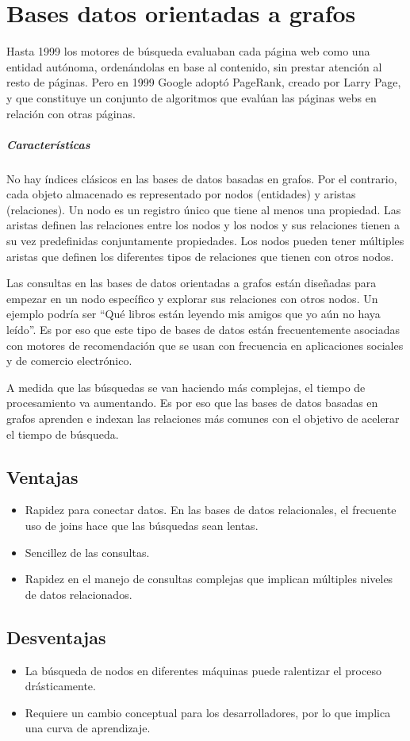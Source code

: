 \section{Bases datos orientadas a grafos}
 Hasta 1999 los motores de búsqueda evaluaban cada página web como una entidad autónoma, ordenándolas en base al contenido, sin prestar atención al resto de páginas. Pero en 1999 Google adoptó PageRank, creado por Larry Page, y que constituye un conjunto de algoritmos que evalúan las páginas webs en relación con otras páginas. \cite{12}

\subparagraph{Características}
No hay índices clásicos en las bases de datos basadas en grafos. Por el contrario, cada objeto almacenado es representado por nodos (entidades) y aristas (relaciones). Un nodo es un registro único que tiene al menos una propiedad. Las aristas definen las relaciones entre los nodos y los nodos y sus relaciones tienen a su vez predefinidas conjuntamente propiedades. Los nodos pueden tener múltiples aristas que definen los diferentes tipos de relaciones que tienen con otros nodos.

Las consultas en las bases de datos orientadas a grafos están diseñadas para empezar en un nodo específico y explorar sus relaciones con otros nodos. Un ejemplo podría ser “Qué libros están leyendo mis amigos que yo aún no haya leído”. Es por eso que este tipo de bases de datos están frecuentemente asociadas con motores de recomendación que se usan con frecuencia en aplicaciones sociales y de comercio electrónico.

A medida que las búsquedas se van haciendo más complejas, el tiempo de procesamiento va aumentando. Es por eso que las bases de datos basadas en grafos aprenden e indexan las relaciones más comunes con el objetivo de acelerar el tiempo de búsqueda. \cite{13}
\subsection{Ventajas\cite{14}}
\begin{itemize}
  \item Rapidez para conectar datos. En las bases de datos relacionales, el frecuente uso de joins hace que las búsquedas sean lentas.
  \item Sencillez de las consultas.
  \item Rapidez en el manejo de consultas complejas que implican múltiples niveles de datos relacionados.
\end{itemize}
\subsection{Desventajas \cite{15}}
\begin{itemize}
  \item La búsqueda de nodos en diferentes máquinas puede ralentizar el proceso drásticamente.
  \item Requiere un cambio conceptual para los desarrolladores, por lo que implica una curva de aprendizaje.
\end{itemize}

